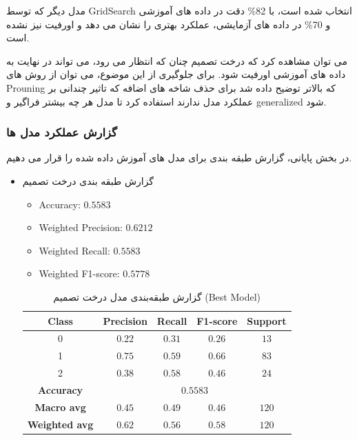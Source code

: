 \documentclass{article}
\begin{document}
مدل دیگر که توسط GridSearch انتخاب شده است، با 82\% دقت در داده های آموزشی و 70\% در داده های آزمایشی، عملکرد بهتری را نشان می دهد و اورفیت نیز نشده است.

می توان مشاهده کرد که درخت تصمیم چنان که انتظار می رود، می تواند در نهایت به داده های آموزشی اورفیت شود. برای جلوگیری از این موضوع، می توان از روش های Prouning که بالاتر توضیح داده شد برای حذف شاخه های اضافه که تاثیر چندانی بر عملکرد مدل ندارند استفاده کرد تا مدل هر چه بیشتر فراگیر و generalized شود.

\subsubsection{گزارش عملکرد مدل ها}
در بخش پایانی، گزارش طبقه بندی برای مدل های آموزش داده شده را قرار می دهیم.

\begin{itemize}
    \item گزارش طبقه بندی درخت تصمیم

\begin{itemize}
    \item Accuracy: $0.5583$
    \item Weighted Precision: $0.6212$
    \item Weighted Recall: $0.5583$
    \item Weighted F1-score: $0.5778$
\end{itemize}

\vspace{0.5em}

\begin{table}[h!]
\centering
\begin{tabular}{|c|c|c|c|c|}
\hline
\textbf{Class} & \textbf{Precision} & \textbf{Recall} & \textbf{F1-score} & \textbf{Support} \\
\hline
0 & $0.22$ & $0.31$ & $0.26$ & $13$ \\
1 & $0.75$ & $0.59$ & $0.66$ & $83$ \\
2 & $0.38$ & $0.58$ & $0.46$ & $24$ \\
\hline
\textbf{Accuracy} & \multicolumn{4}{c|}{$0.5583$} \\
\textbf{Macro avg} & $0.45$ & $0.49$ & $0.46$ & $120$ \\
\textbf{Weighted avg} & $0.62$ & $0.56$ & $0.58$ & $120$ \\
\hline
\end{tabular}
\caption{گزارش طبقه‌بندی مدل درخت تصمیم (Best Model)}
\label{tab:dt_classification_report_best}
\end{table}




\end{itemize}
\end{document}

